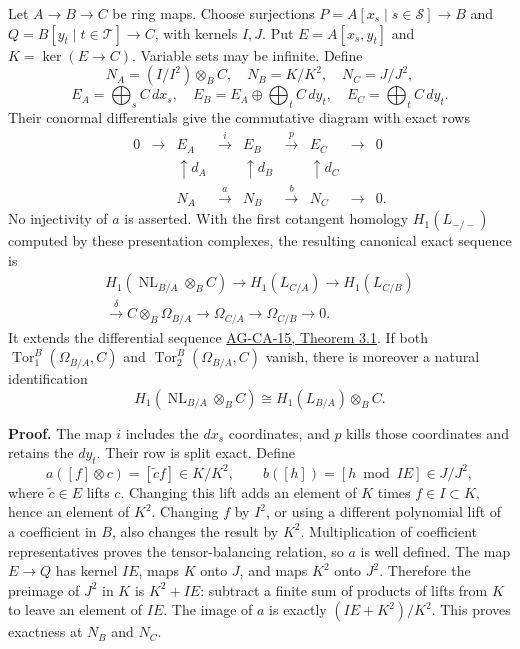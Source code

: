 \documentclass[11pt,a4paper,openany]{report}
\begin{document}
Let \(A\to B\to C\) be ring maps. Choose surjections \(P=A[x_s\mid s\in\mathcal S]\to B\) and \(Q=B[y_t\mid t\in\mathcal T]\to C\), with kernels \(I,J\). Put \(E=A[x_s,y_t]\) and \(K=\ker(E\to C)\). Variable sets may be infinite. Define \[N_A=(I/I^2)\otimes_BC,\quad N_B=K/K^2,\quad N_C=J/J^2,\] \[E_A=\bigoplus_sC\,dx_s,\quad
E_B=E_A\oplus\bigoplus_tC\,dy_t,\quad
E_C=\bigoplus_tC\,dy_t.\] Their conormal differentials give the commutative diagram with exact rows \[\begin{array}{ccccccccc}
0&\longrightarrow&E_A&\xrightarrow{i}&E_B&\xrightarrow{p}&E_C&\longrightarrow&0\\
&&\uparrow d_A&&\uparrow d_B&&\uparrow d_C\\
&&N_A&\xrightarrow{a}&N_B&\xrightarrow{b}&N_C&\longrightarrow&0.
\end{array}\] No injectivity of \(a\) is asserted. With the first cotangent homology \(H_1(L_{-/ -})\) computed by these presentation complexes, the resulting canonical exact sequence is \[\begin{gathered}
H_1(\operatorname{NL}_{B/A}\otimes_BC)\longrightarrow
H_1(L_{C/A})\longrightarrow H_1(L_{C/B})\\
\xrightarrow{\delta} C\otimes_B\Omega_{B/A}
\longrightarrow\Omega_{C/A}\longrightarrow\Omega_{C/B}\longrightarrow0.
\end{gathered}\] It extends the differential sequence \href{https://github.com/KokunoYumeto/open-math-courses/blob/d02d0a3669f42579db037cd44de1d113fdd770a1/docs/courses/AG-CA/src/kahler-differentials.md}{AG-CA-15, Theorem 3.1}. If both \(\operatorname{Tor}_1^B(\Omega_{B/A},C)\) and \(\operatorname{Tor}_2^B(\Omega_{B/A},C)\) vanish, there is moreover a natural identification \[H_1(\operatorname{NL}_{B/A}\otimes_BC)
\cong H_1(L_{B/A})\otimes_BC.\]

\textbf{Proof.} The map \(i\) includes the \(dx_s\) coordinates, and \(p\) kills those coordinates and retains the \(dy_t\). Their row is split exact. Define \[a([f]\otimes c)=[\widetilde c f]\in K/K^2,\qquad
b([h])=[h\bmod IE]\in J/J^2,\] where \(\widetilde c\in E\) lifts \(c\). Changing this lift adds an element of \(K\) times \(f\in I\subset K\), hence an element of \(K^2\). Changing \(f\) by \(I^2\), or using a different polynomial lift of a coefficient in \(B\), also changes the result by \(K^2\). Multiplication of coefficient representatives proves the tensor-balancing relation, so \(a\) is well defined. The map \(E\to Q\) has kernel \(IE\), maps \(K\) onto \(J\), and maps \(K^2\) onto \(J^2\). Therefore the preimage of \(J^2\) in \(K\) is \(K^2+IE\): subtract a finite sum of products of lifts from \(K\) to leave an element of \(IE\). The image of \(a\) is exactly \((IE+K^2)/K^2\). This proves exactness at \(N_B\) and \(N_C\).
\end{document}

